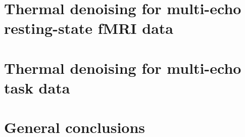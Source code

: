 \documentclass[a4page, 11pt, showtrims]{memoir}
\begin{document}
\chapter{Thermal denoising for multi-echo resting-state fMRI data}

\label{chap:denoising}
\cleardoublepage
\chapter{Thermal denoising for multi-echo task data}

\label{chap:taskdenoising}
\cleardoublepage
\chapter{General conclusions}

\label{chap:conclusions}





%

%


\end{document}
